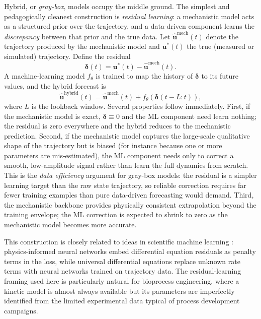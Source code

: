 Hybrid, or \emph{gray-box}, models occupy the middle ground.  The simplest and
pedagogically cleanest construction is \emph{residual learning}: a mechanistic
model acts as a structured prior over the trajectory, and a data-driven component
learns the \emph{discrepancy} between that prior and the true data.  Let
$\hat{\mathbf{u}}^{\mathrm{mech}}(t)$ denote the trajectory produced by the
mechanistic model and $\mathbf{u}^*(t)$ the true (measured or simulated)
trajectory.  Define the residual
\begin{equation}\label{eq:residual}
  \boldsymbol{\delta}(t) = \mathbf{u}^*(t) - \hat{\mathbf{u}}^{\mathrm{mech}}(t).
\end{equation}
A machine-learning model $f_\theta$ is trained to map the history of
$\boldsymbol{\delta}$ to its future values, and the hybrid forecast is
\begin{equation}\label{eq:hybrid_forecast}
  \hat{\mathbf{u}}^{\mathrm{hybrid}}(t) =
      \hat{\mathbf{u}}^{\mathrm{mech}}(t) + f_\theta\!\left(\boldsymbol{\delta}(t - L : t)\right),
\end{equation}
where $L$ is the lookback window.  Several properties follow immediately.
First, if the mechanistic model is exact, $\boldsymbol{\delta} \equiv 0$ and
the ML component need learn nothing; the residual is zero everywhere and the
hybrid reduces to the mechanistic prediction.  Second, if the mechanistic model
captures the large-scale qualitative shape of the trajectory but is biased (for
instance because one or more parameters are mis-estimated), the ML component
needs only to correct a smooth, low-amplitude signal rather than learn the full
dynamics from scratch.  This is the \emph{data efficiency} argument for gray-box
models: the residual is a simpler learning target than the raw state trajectory,
so reliable correction requires far fewer training examples than pure
data-driven forecasting would demand.  Third, the mechanistic backbone provides
physically consistent extrapolation beyond the training envelope; the ML
correction is expected to shrink to zero as the mechanistic model becomes more
accurate.

This construction is closely related to ideas in scientific machine learning
\cite{Raissi2019,Rackauckas2020}: physics-informed neural networks embed differential
equation residuals as penalty terms in the loss, while universal differential
equations replace unknown rate terms with neural networks trained on trajectory
data.  The residual-learning framing used here is particularly natural for
bioprocess engineering, where a kinetic model is almost always available but
its parameters are imperfectly identified from the limited experimental data
typical of process development campaigns.

